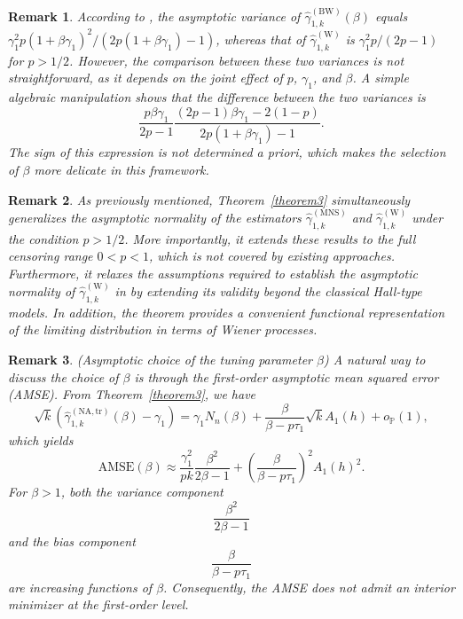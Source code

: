 \documentclass[reqno,openbib,runningheads,a4paper,12pt]{amsart}%
\newtheorem{remark}{Remark}[section]
\begin{document}
\begin{remark}
According to \cite{BWW2019}, the asymptotic variance of $\widehat{\gamma
}_{1,k}^{(\mathrm{BW})}(\beta)$ equals $\gamma_{1}^{2}p(1+\beta\gamma_{1}%
)^{2}/(2p(1+\beta\gamma_{1})-1)$, whereas that of $\widehat{\gamma}%
_{1,k}^{(\mathrm{W})}$ is $\gamma_{1}^{2}p/(2p-1)$ for $p>1/2$. However, the
comparison between these two variances is not straightforward, as it depends
on the joint effect of $p$, $\gamma_{1}$, and $\beta$. A simple algebraic
manipulation shows that the difference between the two variances is
\[
\frac{p\beta\gamma_{1}}{2p-1}\frac{(2p-1)\beta\gamma_{1}-2(1-p)}%
{2p(1+\beta\gamma_{1})-1}.
\]
The sign of this expression is not determined a priori, which makes the
selection of $\beta$ more delicate in this framework.
\end{remark}

\begin{remark}
As previously mentioned, Theorem~\ref{theorem3} simultaneously generalizes the
asymptotic normality of the estimators $\widehat{\gamma}_{1,k}^{(\mathrm{MNS}
)}$ and $\widehat{\gamma}_{1,k}^{(\mathrm{W})}$ under the condition $p>1/2$.
More importantly, it extends these results to the full censoring range
$0<p<1$, which is not covered by existing approaches. Furthermore, it relaxes
the assumptions required to establish the asymptotic normality of
$\widehat{\gamma}_{1,k}^{(\mathrm{W})}$ in \cite{BWW2019} by extending its
validity beyond the classical Hall-type models. In addition, the theorem
provides a convenient functional representation of the limiting distribution
in terms of Wiener processes.
\end{remark}

\begin{remark}
(Asymptotic choice of the tuning parameter $\beta$) A natural way to discuss
the choice of $\beta$ is through the first-order asymptotic mean squared error
(AMSE). From Theorem~\ref{theorem3}, we have
\[
\sqrt{k}\left(  \widehat{\gamma}_{1,k}^{(\mathrm{NA,tr})}(\beta)-\gamma
_{1}\right)  =\gamma_{1}N_{n}(\beta)+\frac{\beta}{\beta-p\tau_{1}}\sqrt
{k}A_{1}(h)+o_{\mathbb{P}}(1),
\]
which yields
\[
\mathrm{AMSE}(\beta)\approx\frac{\gamma_{1}^{2}}{pk}\frac{\beta^{2}}{2\beta
-1}+\left(  \frac{\beta}{\beta-p\tau_{1}}\right)  ^{2}A_{1}(h)^{2}.
\]
For $\beta>1$, both the variance component
\[
\frac{\beta^{2}}{2\beta-1}%
\]
and the bias component
\[
\frac{\beta}{\beta-p\tau_{1}}%
\]
are increasing functions of $\beta$. Consequently, the AMSE does not admit an
interior minimizer at the first-order level.
\end{remark}
\end{document}
